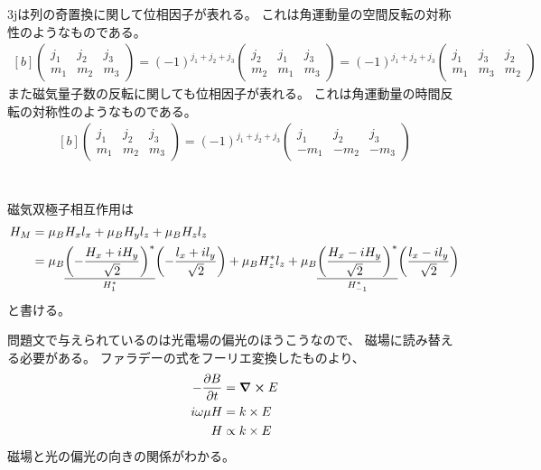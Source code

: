\documentclass[../ap_2011.tex]{subfiles}
\begin{document}
3jは列の奇置換に関して位相因子が表れる。
これは角運動量の空間反転の対称性のようなものである。
\begin{equation}\begin{aligned}[b]
    \begin{pmatrix}
        j_1 & j_2 & j_3\\
        m_1 & m_2 & m_3
    \end{pmatrix}
    =(-1)^{j_1+j_2+j_3}\begin{pmatrix}
        j_2 & j_1 & j_3\\
        m_2 & m_1 & m_3
    \end{pmatrix}=(-1)^{j_1+j_2+j_3}\begin{pmatrix}
        j_1 & j_3 & j_2\\
        m_1 & m_3 & m_2
    \end{pmatrix}
\end{aligned}\end{equation}
また磁気量子数の反転に関しても位相因子が表れる。
これは角運動量の時間反転の対称性のようなものである。
\begin{equation}\begin{aligned}[b]
    \begin{pmatrix}
        j_1 & j_2 & j_3\\
        m_1 & m_2 & m_3
    \end{pmatrix}
    =(-1)^{j_1+j_2+j_3}\begin{pmatrix}
        j_1 & j_2 & j_3\\
        -m_1 & -m_2 & -m_3
    \end{pmatrix}
\end{aligned}\end{equation}

\section{}
磁気双極子相互作用は
\begin{equation}\begin{aligned}[b]
    H_M &= \mu_BH_xl_x + \mu_BH_yl_z+\mu_BH_zl_z\\
    &=\mu_B\underset{H_1^*}{\underline{\qty(-\frac{H_x+iH_y}{\sqrt{2}})^*}}\qty(-\frac{l_x+il_y}{\sqrt{2}})
    +\mu_BH_z^* l_z
    +\mu_B\underset{H_{-1}^*}{\underline{\qty(\frac{H_x-iH_y}{\sqrt{2}})^*}}\qty(\frac{l_x-il_y}{\sqrt{2}})
\end{aligned}\end{equation}
と書ける。

問題文で与えられているのは光電場の偏光のほうこうなので、
磁場に読み替える必要がある。
ファラデーの式をフーリエ変換したものより、
\begin{equation}\begin{aligned}[b]
    -\pdv{B}{t}&=\curl E\\
    i\omega \mu H &= k\times E\\
    H &\propto k\times E
\end{aligned}\end{equation}
磁場と光の偏光の向きの関係がわかる。
\end{document}
